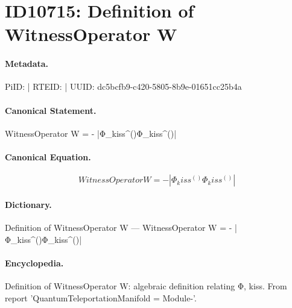 \section*{ID10715: Definition of WitnessOperator W}
\paragraph{Metadata.}
PiID:  | RTEID:  | UUID: dc5bcfb9-c420-5805-8b9e-01651cc25b4a

\paragraph{Canonical Statement.}
WitnessOperator W = - |Φ\_kiss\textasciicircum{}()Φ\_kiss\textasciicircum{}()|

\paragraph{Canonical Equation.}
\[
WitnessOperator  W =  - |Φ_kiss^()Φ_kiss^()|
\]

\paragraph{Dictionary.}
Definition of WitnessOperator W — WitnessOperator  W =  - |Φ\_kiss\textasciicircum{}()Φ\_kiss\textasciicircum{}()|

\paragraph{Encyclopedia.}
Definition of WitnessOperator W: algebraic definition relating Φ, kiss. From report 'QuantumTeleportationManifold = Module-'.
